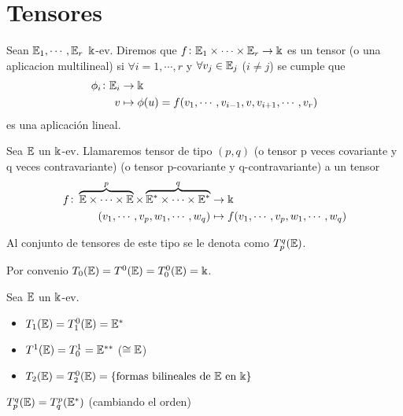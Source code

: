 \section{Tensores}

\begin{defi}
    Sean $\mathbb{E}_1,\cdots , \mathbb{E}_r$ $\Bbbk$-ev. Diremos que
    $f \colon \mathbb{E}_1 \times \cdots \times \mathbb{E}_r \to \Bbbk$ es un tensor (o una aplicacion
    multilineal) si $\forall i=1,\cdots , r$ y $\forall v_j \in \mathbb{E}_j$ ($i \neq j$)
    se cumple que
    \[
         \begin{aligned}
             \phi_i \colon \mathbb{E}_i &\to \Bbbk \\
             v &\mapsto \phi(u)=f(v_1,\cdots , v_{i-1}, v, v_{i+1}, \cdots , v_r)
         \end{aligned}
    \]
    es una aplicación lineal.
\end{defi}
\begin{defi}
    Sea $\mathbb{E}$ un $\Bbbk$-ev. Llamaremos tensor de tipo $(p,q)$ (o tensor p veces
    covariante y q veces contravariante) (o tensor p-covariante y q-contravariante)
    a un tensor
    \[
        \begin{aligned}
            f \colon \overbrace{\mathbb{E} \times \cdots \times \mathbb{E}}^p\times
            \overbrace{\mathbb{E}^* \times \cdots \times \mathbb{E}^*}^q&\to \Bbbk \\
            (v_1, \cdots, v_p, w_1, \cdots, w_q) &\mapsto
            f(v_1,\cdots,v_p,w_1,\cdots,w_q)
        \end{aligned}
    \]
\end{defi}
\begin{obs}
    Al conjunto de tensores  de este tipo se le denota como $T_p^q(\mathbb{E})$.
\end{obs}
\begin{obs}
    Por convenio $T_0(\mathbb{E}) = T^0(\mathbb{E}) = T_0^0(\mathbb{E}) = \Bbbk$.
\end{obs}
\begin{example}
    Sea $\mathbb{E}$ un $\Bbbk$-ev.
    \begin{itemize}
        \item $T_1(\mathbb{E}) = T_1^0(\mathbb{E}) = \mathbb{E}^*$
        \item $T^1(\mathbb{E}) = T_0^1 = \mathbb{E}^{**}$ ($\cong \mathbb{E}$)
        \item $T_2(\mathbb{E}) = T_2^0(\mathbb{E}) = \{\text{formas bilineales de } \mathbb{E} \text{ en } \Bbbk\}$
    \end{itemize}
\end{example}
\begin{prop}
    $T_p^q(\mathbb{E}) = T_q^p(\mathbb{E}^*)$ (cambiando el orden)
\end{prop}
